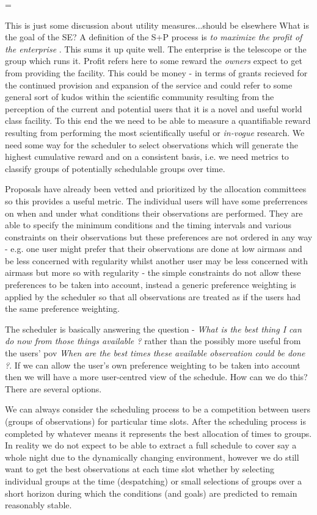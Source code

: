 \documentclass[12pt,a4paper]{article}
\makeatletter
\let\realnormalsize=\normalsize
\def\liih@math{\ifmmode$\else\bad@math\fi}
\def\adjustnormalsize{\def\normalsize{\mathsurround=0pt \realnormalsize
 \parindent=0pt\abovedisplayskip=0pt\belowdisplayskip=0pt}%
 \def\phantompar{\csname par\endcsname}\normalsize}%
\newcommand\lthtmlvboxmathA{\adjustnormalsize\setbox\sizebox=\vbox\bgroup %
 \let\ifinner=\iffalse \let\)\liih@math }%
\newcommand\lthtmlmathtype[1]{\gdef\lthtmlmathenv{#1}}%
\newcommand\lthtmlfigureA[1]{\let\@savefreelist\@freelist
       \lthtmlmathtype{#1}\lthtmlvboxmathA}%
\makeatother
\begin{document}
{\newpage\clearpage
\lthtmlfigureA{note1450}%
\begin{note}This is just some discussion about utility measures...should be elsewhere
What is the goal of the SE? A definition of the S+P process is \emph{to maximize the profit of the enterprise} \cite{miyashita96distributed}. This sums it up quite well. The enterprise is the telescope or the group which runs it. Profit refers here to some reward the \emph{owners} expect to get from providing the facility. This could be money - in terms of grants recieved for the continued provision and expansion of the service and could refer to some general sort of kudos within the scientific community resulting from the perception of the current and potential users that it is a novel and useful world class facility. To this end the we need to be able to measure a quantifiable reward resulting from performing the most scientifically useful or \emph{in-vogue} research. We need some way for the scheduler to select observations which will generate the highest cumulative reward and on a consistent basis, i.e. we need metrics to classify groups of potentially schedulable groups over time. 
\par
Proposals have already been vetted and prioritized by the allocation committees so this provides a useful metric. The individual users will have some preferrences on when and under what conditions their observations are performed. They are able to specify the minimum conditions and the timing intervals and various constraints on their observations but these preferences are not ordered in any way - e.g. one user might prefer that their observations are done at low airmass and be less concerned with regularity whilst another user may be less concerned with airmass but more so with regularity - the simple constraints do not allow these preferences to be taken into account, instead a generic preference weighting is applied by the scheduler so that all observations are treated as if the users had the same preference weighting. 
\par
The scheduler is basically answering the question - \emph{What is the best thing I can do now from those things available ?} rather than the possibly more useful from the users' pov \emph{When are the best times these available observation could be done ?}. If we can allow the user's own preference weighting to be taken into account then we will have a more user-centred view of the schedule. How can we do this? There are several options.
\par
We can always consider the scheduling process to be a competition between users (groups of observations) for particular time slots. After the scheduling process is completed by whatever means it represents the best allocation of times to groups. In reality we do not expect to be able to extract a full schedule to cover say a whole night due to the dynamically changing environment, however we do still want to get the best observations at each time slot whether by selecting individual groups at the time (despatching) or small selections of groups over a short horizon during which the conditions (and goals) are predicted to remain reasonably stable. 

\end{note}}
\end{document}
